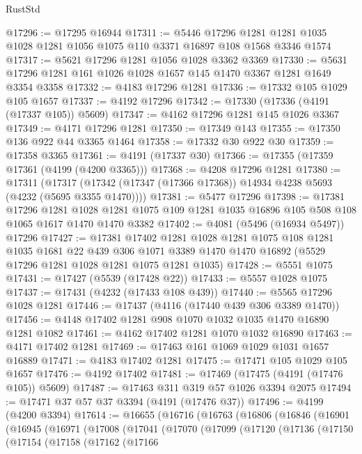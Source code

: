 \begin{lexlean}{RustStd}
\begin{coremodule}
@17296 := @17295 @16944
@17311 := @5446
    @17296
    @1281
    @1281
    @1035
    @1028
    @1281
    @1056
    @1075
    @110
    @3371
    @16897
    @108
    @1568
    @3346
    @1574
@17317 := @5621 @17296 @1281 @1056 @1028 @3362 @3369
@17330 := @5631 @17296 @1281 @161 @1026 @1028 @1657 @145 @1470 @3367 @1281 @1649 @3354 @3358
@17332 := @4183 @17296 @1281
@17336 := @17332 @105 @1029 @105 @1657
@17337 := @4192 @17296
@17342 := @17330 (@17336 (@4191 (@17337 @105)) @5609)
@17347 := @4162 @17296 @1281 @145 @1026 @3367
@17349 := @4171 @17296 @1281
@17350 := @17349 @143
@17355 := @17350 @136 @922 @44 @3365 @1464
@17358 := @17332 @30 @922 @30
@17359 := @17358 @3365
@17361 := @4191 (@17337 @30)
@17366 := @17355 (@17359 @17361 (@4199 (@4200 @3365)))
@17368 := @4208 @17296 @1281
@17380 := @17311
    (@17317 (@17342 (@17347 (@17366 @17368)) @14934 @4238 @5693 (@4232 (@5695 @3355 @1470))))
@17381 := @5477 @17296
@17398 := @17381
    @17296
    @1281
    @1028
    @1281
    @1075
    @109
    @1281
    @1035
    @16896
    @105
    @508
    @108
    @1065
    @1617
    @1470
    @1470
    @3382
@17402 := @4081 (@5496 (@16934 @5497)) @17296
@17427 := @17381
    @17402
    @1281
    @1028
    @1281
    @1075
    @108
    @1281
    @1035
    @1681
    @22
    @439
    @306
    @1071
    @3389
    @1470
    @1470
    @16892
    (@5529 @17296 @1281 @1028 @1281 @1075 @1281 @1035)
@17428 := @5551 @1075
@17431 := @17427 (@5539 (@17428 @22))
@17433 := @5557 @1028 @1075
@17437 := @17431 (@4232 (@17433 @108 @439))
@17440 := @5565 @17296 @1028 @1281
@17446 := @17437 (@4116 (@17440 @439 @306 @3389 @1470))
@17456 := @4148 @17402 @1281 @908 @1070 @1032 @1035 @1470 @16890 @1281 @1082
@17461 := @4162 @17402 @1281 @1070 @1032 @16890
@17463 := @4171 @17402 @1281
@17469 := @17463 @161 @1069 @1029 @1031 @1657 @16889
@17471 := @4183 @17402 @1281
@17475 := @17471 @105 @1029 @105 @1657
@17476 := @4192 @17402
@17481 := @17469 (@17475 (@4191 (@17476 @105)) @5609)
@17487 := @17463 @311 @319 @57 @1026 @3394 @2075
@17494 := @17471 @37 @57 @37 @3394 (@4191 (@17476 @37))
@17496 := @4199 (@4200 @3394)
@17614 := @16655
    (@16716
      (@16763
        (@16806
          (@16846
            (@16901
              (@16945
                (@16971
                  (@17008
                    (@17041
                      (@17070
                        (@17099
                          (@17120
                            (@17136
                              (@17150
                                (@17154
                                  (@17158
                                    (@17162
                                      (@17166

\end{coremodule}
\end{lexlean}
